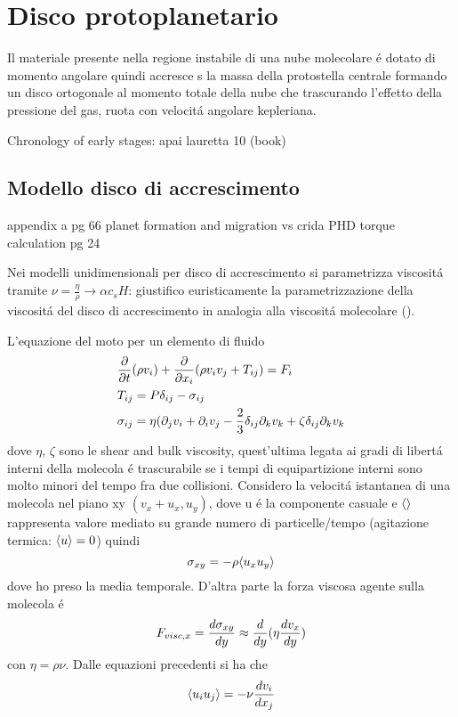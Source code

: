 {\let\clearpage\relax\let\cleardoublepage\relax
\chapter{Disco protoplanetario}
}

Il materiale presente nella regione instabile di una nube molecolare \'e dotato di momento angolare quindi accresce s la massa della protostella centrale formando un disco ortogonale al momento totale della nube che trascurando l'effetto della pressione del gas, ruota con velocit\'a angolare kepleriana.

\begin{workout}
Chronology of  early stages: apai lauretta 10 (book)
\end{workout}

\section{Modello disco di accrescimento}

\begin{workout}
appendix a pg 66 planet formation and migration vs crida PHD torque calculation pg 24
\end{workout}

Nei modelli unidimensionali per disco di accrescimento si parametrizza viscosit\'a tramite $\nu=\frac{\eta}{\rho}\to\alpha c_s H$: giustifico euristicamente la parametrizzazione della viscosit\'a del disco di accrescimento in analogia alla viscosit\'a molecolare (\cite{bouvier2002theory}).

L'equazione del moto per un elemento di fluido
\begin{align}
&\PDof{t}(\rho v_i)+\PDof{x_i}(\rho v_iv_j+T_{ij})=F_i\\
&T_{ij}=P\delta_{ij}-\sigma_{ij}\\
&\sigma_{ij}=\eta(\partial_jv_i+\partial_iv_j-\frac{2}{3}\delta_{ij}\partial_kv_k+\zeta\delta_{ij}\partial_kv_k
\end{align}
dove $\eta$, $\zeta$ sono le shear and bulk viscosity, quest'ultima legata ai gradi di libert\'a interni della molecola \'e trascurabile se i tempi di equipartizione interni sono molto minori del tempo fra due collisioni.
Considero la velocit\'a istantanea di una molecola nel piano xy $(v_x+u_x,u_y)$, dove u \'e la componente casuale e $\exv{}$ rappresenta valore mediato su grande numero di particelle/tempo (agitazione termica: $\exv{u}=0$) quindi
\begin{equation}
\sigma_{xy}=-\rho\exv{u_xu_y}
\end{equation}
dove ho preso la media temporale.
D'altra parte la forza viscosa agente sulla molecola \'e
\begin{equation}
F_{visc,x}=\TDy{y}{\sigma_{xy}}\approx\TDof{y}(\eta\TDy{y}{v_x})
\end{equation}
con $\eta=\rho\nu$.
Dalle equazioni precedenti si ha che
\begin{equation}
\exv{u_iu_j}=-\nu\TDy{x_j}{v_i}
\end{equation}

